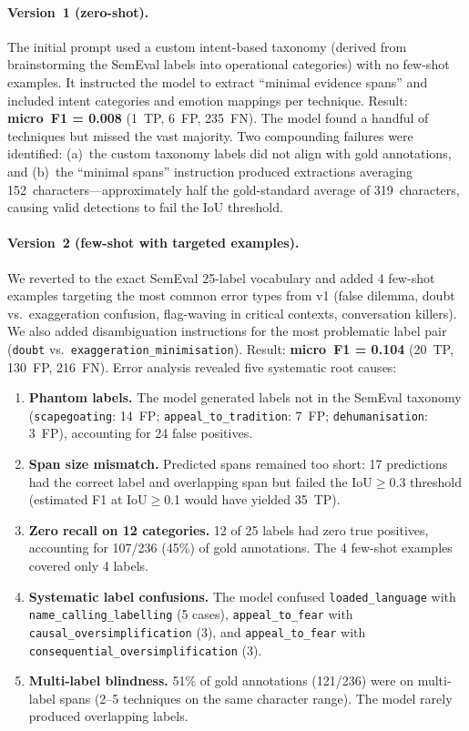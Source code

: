 \documentclass[10pt, a4paper]{article}
\begin{document}
\paragraph{Version~1 (zero-shot).}
The initial prompt used a custom intent-based taxonomy (derived from brainstorming the SemEval labels into operational categories) with no few-shot examples. It instructed the model to extract ``minimal evidence spans'' and included intent categories and emotion mappings per technique. Result: \textbf{micro~F1 = 0.008} (1~TP, 6~FP, 235~FN). The model found a handful of techniques but missed the vast majority. Two compounding failures were identified: (a)~the custom taxonomy labels did not align with gold annotations, and (b)~the ``minimal spans'' instruction produced extractions averaging 152~characters---approximately half the gold-standard average of 319~characters, causing valid detections to fail the IoU threshold.

\paragraph{Version~2 (few-shot with targeted examples).}
We reverted to the exact SemEval 25-label vocabulary and added 4 few-shot examples targeting the most common error types from v1 (false dilemma, doubt vs.\ exaggeration confusion, flag-waving in critical contexts, conversation killers). We also added disambiguation instructions for the most problematic label pair (\texttt{doubt} vs.\ \texttt{exaggeration\_minimisation}). Result: \textbf{micro~F1 = 0.104} (20~TP, 130~FP, 216~FN). Error analysis revealed five systematic root causes:

\begin{enumerate}
\item \textbf{Phantom labels.} The model generated labels not in the SemEval taxonomy (\texttt{scapegoating}: 14~FP; \texttt{appeal\_to\_tradition}: 7~FP; \texttt{dehumanisation}: 3~FP), accounting for 24 false positives.
\item \textbf{Span size mismatch.} Predicted spans remained too short: 17 predictions had the correct label and overlapping span but failed the IoU$\geq$0.3 threshold (estimated F1 at IoU$\geq$0.1 would have yielded 35~TP).
\item \textbf{Zero recall on 12 categories.} 12 of 25 labels had zero true positives, accounting for 107/236 (45\%) of gold annotations. The 4 few-shot examples covered only 4 labels.
\item \textbf{Systematic label confusions.} The model confused \texttt{loaded\_language} with \texttt{name\_calling\_labelling} (5 cases), \texttt{appeal\_to\_fear} with \texttt{causal\_oversimplification} (3), and \texttt{appeal\_to\_fear} with \texttt{consequential\_oversimplification} (3).
\item \textbf{Multi-label blindness.} 51\% of gold annotations (121/236) were on multi-label spans (2--5 techniques on the same character range). The model rarely produced overlapping labels.
\end{enumerate}
\end{document}
